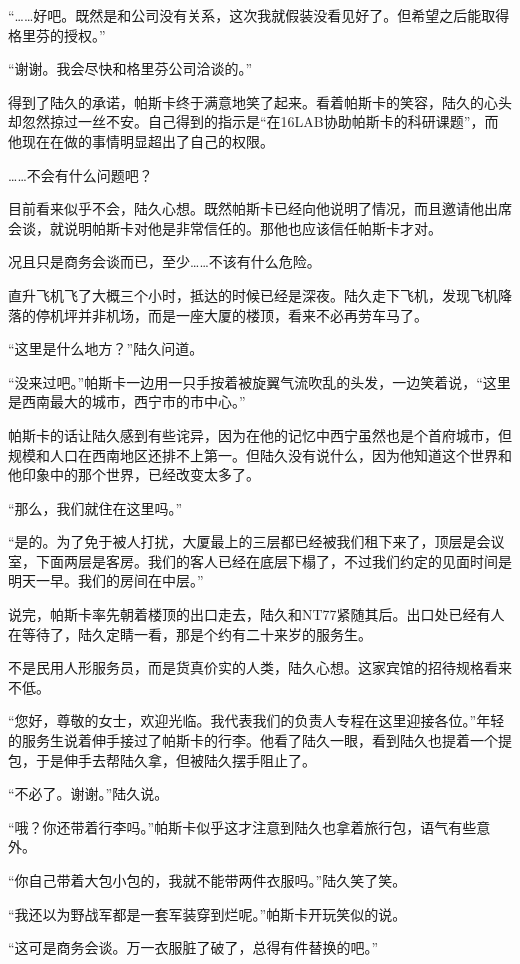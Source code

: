 “……好吧。既然是和公司没有关系，这次我就假装没看见好了。但希望之后能取得格里芬的授权。”

“谢谢。我会尽快和格里芬公司洽谈的。”

得到了陆久的承诺，帕斯卡终于满意地笑了起来。看着帕斯卡的笑容，陆久的心头却忽然掠过一丝不安。自己得到的指示是“在16LAB协助帕斯卡的科研课题”，而他现在在做的事情明显超出了自己的权限。

……不会有什么问题吧？

目前看来似乎不会，陆久心想。既然帕斯卡已经向他说明了情况，而且邀请他出席会谈，就说明帕斯卡对他是非常信任的。那他也应该信任帕斯卡才对。

况且只是商务会谈而已，至少……不该有什么危险。

直升飞机飞了大概三个小时，抵达的时候已经是深夜。陆久走下飞机，发现飞机降落的停机坪并非机场，而是一座大厦的楼顶，看来不必再劳车马了。

“这里是什么地方？”陆久问道。

“没来过吧。”帕斯卡一边用一只手按着被旋翼气流吹乱的头发，一边笑着说，“这里是西南最大的城市，西宁市的市中心。”

帕斯卡的话让陆久感到有些诧异，因为在他的记忆中西宁虽然也是个首府城市，但规模和人口在西南地区还排不上第一。但陆久没有说什么，因为他知道这个世界和他印象中的那个世界，已经改变太多了。

“那么，我们就住在这里吗。”

“是的。为了免于被人打扰，大厦最上的三层都已经被我们租下来了，顶层是会议室，下面两层是客房。我们的客人已经在底层下榻了，不过我们约定的见面时间是明天一早。我们的房间在中层。”

说完，帕斯卡率先朝着楼顶的出口走去，陆久和NT77紧随其后。出口处已经有人在等待了，陆久定睛一看，那是个约有二十来岁的服务生。

不是民用人形服务员，而是货真价实的人类，陆久心想。这家宾馆的招待规格看来不低。

“您好，尊敬的女士，欢迎光临。我代表我们的负责人专程在这里迎接各位。”年轻的服务生说着伸手接过了帕斯卡的行李。他看了陆久一眼，看到陆久也提着一个提包，于是伸手去帮陆久拿，但被陆久摆手阻止了。

“不必了。谢谢。”陆久说。

“哦？你还带着行李吗。”帕斯卡似乎这才注意到陆久也拿着旅行包，语气有些意外。

“你自己带着大包小包的，我就不能带两件衣服吗。”陆久笑了笑。

“我还以为野战军都是一套军装穿到烂呢。”帕斯卡开玩笑似的说。

“这可是商务会谈。万一衣服脏了破了，总得有件替换的吧。”


